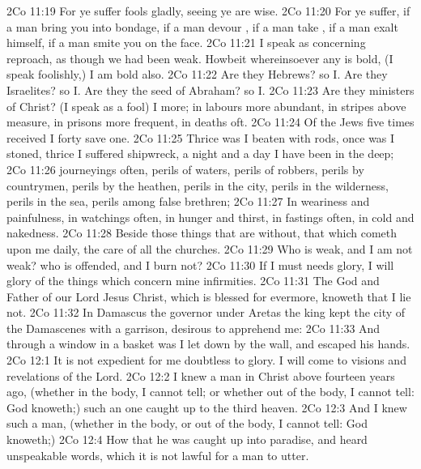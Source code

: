 \vs 2Co 11:19 For ye suffer fools gladly, seeing ye  are wise.
\vs 2Co 11:20 For ye suffer, if a man bring you into bondage, if a man devour , if a man take , if a man exalt himself, if a man smite you on the face.
\vs 2Co 11:21 I speak as concerning reproach, as though we had been weak. Howbeit whereinsoever any is bold, (I speak foolishly,) I am bold also.
\vs 2Co 11:22 Are they Hebrews? so  I. Are they Israelites? so  I. Are they the seed of Abraham? so  I.
\vs 2Co 11:23 Are they ministers of Christ? (I speak as a fool) I  more; in labours more abundant, in stripes above measure, in prisons more frequent, in deaths oft.
\vs 2Co 11:24 Of the Jews five times received I forty  save one.
\vs 2Co 11:25 Thrice was I beaten with rods, once was I stoned, thrice I suffered shipwreck, a night and a day I have been in the deep;
\vs 2Co 11:26  journeyings often,  perils of waters,  perils of robbers,  perils by  countrymen,  perils by the heathen,  perils in the city,  perils in the wilderness,  perils in the sea,  perils among false brethren;
\vs 2Co 11:27 In weariness and painfulness, in watchings often, in hunger and thirst, in fastings often, in cold and nakedness.
\vs 2Co 11:28 Beside those things that are without, that which cometh upon me daily, the care of all the churches.
\vs 2Co 11:29 Who is weak, and I am not weak? who is offended, and I burn not?
\vs 2Co 11:30 If I must needs glory, I will glory of the things which concern mine infirmities.
\vs 2Co 11:31 The God and Father of our Lord Jesus Christ, which is blessed for evermore, knoweth that I lie not.
\vs 2Co 11:32 In Damascus the governor under Aretas the king kept the city of the Damascenes with a garrison, desirous to apprehend me:
\vs 2Co 11:33 And through a window in a basket was I let down by the wall, and escaped his hands.
\vs 2Co 12:1 It is not expedient for me doubtless to glory. I will come to visions and revelations of the Lord.
\vs 2Co 12:2 I knew a man in Christ above fourteen years ago, (whether in the body, I cannot tell; or whether out of the body, I cannot tell: God knoweth;) such an one caught up to the third heaven.
\vs 2Co 12:3 And I knew such a man, (whether in the body, or out of the body, I cannot tell: God knoweth;)
\vs 2Co 12:4 How that he was caught up into paradise, and heard unspeakable words, which it is not lawful for a man to utter.
